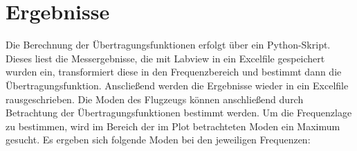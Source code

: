 \section{Ergebnisse}
    Die Berechnung der Übertragungsfunktionen erfolgt über ein Python-Skript.
    Dieses liest die Messergebnisse, die mit Labview in ein  Excelfile
    gespeichert wurden ein, transformiert diese in den Frequenzbereich und
    bestimmt dann die Übertragungsfunktion. Anscließend werden die Ergebnisse
    wieder in ein Excelfile rausgeschrieben. 
    Die Moden des Flugzeugs können anschließend durch Betrachtung der
    Übertragungsfunktionen bestimmt werden. Um die Frequenzlage zu bestimmen,
    wird im Bereich der im Plot betrachteten Moden ein Maximum gesucht.
    Es ergeben sich folgende Moden bei den jeweiligen Frequenzen: